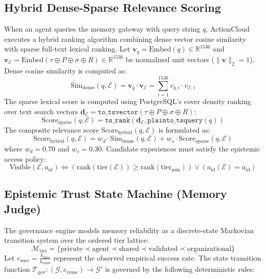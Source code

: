 \documentclass[lettersize,journal]{IEEEtran}
\begin{document}
\subsection{Hybrid Dense-Sparse Relevance Scoring}
When an agent queries the memory gateway with query string $q$, ActionCloud executes a hybrid ranking algorithm combining dense vector cosine similarity with sparse full-text lexical ranking. Let $\mathbf{v}_q = \text{Embed}(q) \in \mathbb{R}^{1536}$ and $\mathbf{v}_{\mathcal{E}} = \text{Embed}(\tau \oplus P \oplus \sigma \oplus R) \in \mathbb{R}^{1536}$ be normalized unit vectors ($\|\mathbf{v}\|_2 = 1$). Dense cosine similarity is computed as:
\begin{equation}
\label{eq:cosine}
\text{Sim}_{\text{dense}}(q, \mathcal{E}) = \mathbf{v}_q \cdot \mathbf{v}_{\mathcal{E}} = \sum_{i=1}^{1536} v_{q, i} \cdot v_{\mathcal{E}, i}
\end{equation}
The sparse lexical score is computed using PostgreSQL's cover density ranking over text search vectors $\mathbf{d}_{\mathcal{E}} = \texttt{to\_tsvector}(\tau \oplus P \oplus \sigma \oplus R)$:
\begin{equation}
\label{eq:sparse}
\text{Score}_{\text{sparse}}(q, \mathcal{E}) = \texttt{ts\_rank}(\mathbf{d}_{\mathcal{E}}, \texttt{plainto\_tsquery}(q))
\end{equation}
The composite relevance score $\text{Score}_{\text{hybrid}}(q, \mathcal{E})$ is formulated as:
\begin{equation}
\label{eq:hybrid}
\text{Score}_{\text{hybrid}}(q, \mathcal{E}) = w_d \cdot \text{Sim}_{\text{dense}}(q, \mathcal{E}) + w_s \cdot \text{Score}_{\text{sparse}}(q, \mathcal{E})
\end{equation}
where $w_d = 0.70$ and $w_s = 0.30$. Candidate experiences must satisfy the epistemic access policy:
\begin{equation}
\label{eq:policy}
\text{Visible}(\mathcal{E}, a_{\text{id}}) \iff \left(\text{rank}(\text{tier}(\mathcal{E})) \ge \text{rank}(\text{tier}_{\min})\right) \lor \left(a_{\text{id}}(\mathcal{E}) = a_{\text{id}}\right)
\end{equation}

\subsection{Epistemic Trust State Machine (Memory Judge)}
The governance engine models memory reliability as a discrete-state Markovian transition system over the ordered tier lattice:
\begin{equation}
\mathcal{M}_{\text{tier}} = \{\text{private} \prec \text{agent} \prec \text{shared} \prec \text{validated} \prec \text{organizational}\}
\end{equation}
Let $r_{\text{succ}} = \frac{k_{\text{succ}}}{k_{\text{reuse}}}$ represent the observed empirical success rate. The state transition function $\mathcal{T}_{\text{gov}}: (\mathcal{G}, e_{\text{reuse}}) \rightarrow \mathcal{G}'$ is governed by the following deterministic rules:
\end{document}
